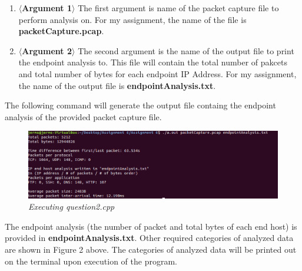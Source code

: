 \documentclass[a4paper,11pt]{article}
\begin{document}
\begin{enumerate}
\item \textbf{$\langle$Argument 1$\rangle$}
\newline The first argument is name of the packet capture file to perform analysis on. For my assignment, the name of the file is \textbf{packetCapture.pcap}.
\item \textbf{$\langle$Argument 2$\rangle$}
\newline The second argument is the name of the output file to print the endpoint analysis to. This file will contain the total number of pakcets and total number of bytes for each endpoint IP Address. For my assignment, the name of the output file is \textbf{endpointAnalysis.txt}.
\end{enumerate}
The following command will generate the output file containg the endpoint analysis of the provided packet capture file.
\newline
\begin{figure}[h!]
	\includegraphics[width = 16cm]{question2}
	\caption{\textit{Executing question2.cpp}}
\end{figure}
\newline
The endpoint analysis (the number of packet and total bytes of each end host) is provided in \textbf{endpointAnalysis.txt}. Other required categories of analyzed data are shown in Figure 2 above. The categories of analyzed data will be printed out on the terminal upon execution of the program.
\end{document}
